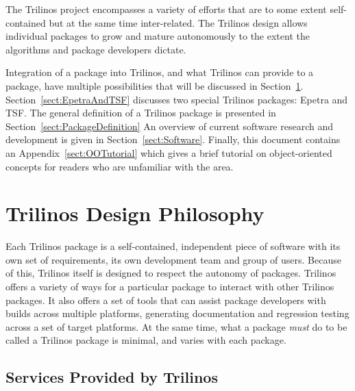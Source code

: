 \documentclass[12pt,relax]{SANDreport}
\begin{document}
The Trilinos project encompasses a variety of efforts that are to some
extent self-contained but at the same time inter-related.  The
Trilinos design allows individual packages to grow and mature
autonomously to the extent the algorithms and package developers
dictate. 

Integration of a package into Trilinos, and what Trilinos can provide
to a package, have multiple possibilities
that will be discussed in Section~\ref{sect:TrilinosDesign}.
Section~\ref{sect:EpetraAndTSF} discusses two special Trilinos
packages: Epetra and TSF.  The general definition of a Trilinos
package is presented in Section~\ref{sect:PackageDefinition}
An overview of current software research and
development is given in Section~\ref{sect:Software}.  
Finally, this document contains
an Appendix~\ref{sect:OOTutorial} which gives a brief
tutorial on object-oriented concepts for readers who are unfamiliar
with the area.  

\section{Trilinos Design Philosophy}
\label{sect:TrilinosDesign}
Each Trilinos package is a self-contained, independent piece
of software with its own set of requirements, its own development team
and group of users.  Because of this,
Trilinos itself is designed to respect the autonomy of packages.
Trilinos offers a variety of ways for a particular package to interact with other
Trilinos packages.  It also offers a set of tools that can
assist package developers with builds across multiple platforms, generating
documentation and regression testing across a set of target platforms.
At the same time, what a package {\it must} do to be called a Trilinos
package is minimal, and varies with each package.

\subsection{Services Provided by Trilinos}
\end{document}
